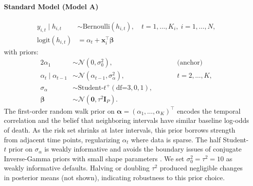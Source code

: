 \documentclass[twoside,11pt]{article}
\newcommand{\bx}{\mathbf{x}}
\begin{document}
\paragraph{Standard Model (Model A)}  \label{sc:standard-model} 
\begin{align}
    y_{i,t} \mid h_{i,t} &\sim \text{Bernoulli}(h_{i,t}), \quad t = 1, \dots, K_i,\; i = 1, \dots, N, \label{eq:obs-model} \\
    \text{logit}(h_{i,t}) &= \alpha_t + \bx_i^\top \boldsymbol{\beta}
    \label{eq:link-standard}
\end{align}
with priors:
\begin{alignat}{2}
    \alpha_1 &\sim \mathcal{N}(0, \sigma_0^2), &\qquad&\text{(anchor)} \label{eq:alpha1-prior} \\
    \alpha_t \mid \alpha_{t-1} &\sim \mathcal{N}(\alpha_{t-1}, \sigma_\alpha^2), &\qquad& t = 2, \dots, K, \label{eq:rw-prior} \\
    \sigma_\alpha &\sim \text{Student-}t^+(\text{df=}3, 0, 1), \label{eq:sigma-alpha-prior} \\
    \boldsymbol{\beta} &\sim \mathcal{N}(\mathbf{0}, \tau^2 \mathbf{I}_P). \label{eq:beta-prior}
\end{alignat}
The first-order random walk prior on \(\boldsymbol{\alpha} = (\alpha_1, \dots, \alpha_K)^\top\) encodes the temporal correlation and the belief that neighboring intervals have similar baseline log-odds of death. As the risk set shrinks at later intervals, this prior borrows strength from adjacent time points, regularizing \(\alpha_t\) where data is sparse. The half Student-\(t\) prior on \(\sigma_\alpha\) is weakly informative and avoids the boundary issues of conjugate Inverse-Gamma priors with small shape parameters \citep{gelman-prior-2006}. We set $\sigma_0^2 = \tau^2 = 10$ as weakly informative defaults. Halving or doubling \(\tau^2\) produced negligible changes in posterior means (not shown), indicating robustness to this prior choice.
 
\end{document}
